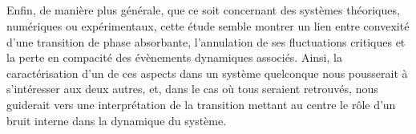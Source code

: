 \subparagraph{}Enfin, de manière plus générale, que ce soit concernant des systèmes théoriques, numériques ou expérimentaux, cette étude semble montrer un lien entre convexité d'une transition de phase absorbante, l'annulation de ses fluctuations critiques et la perte en compacité des évènements dynamiques associés. Ainsi, la caractérisation d'un de ces aspects dans un système quelconque nous pousserait à s'intéresser aux deux autres, et, dans le cas où tous seraient retrouvés, nous guiderait vers une interprétation de la transition mettant au centre le rôle d'un bruit interne dans la dynamique du système.

